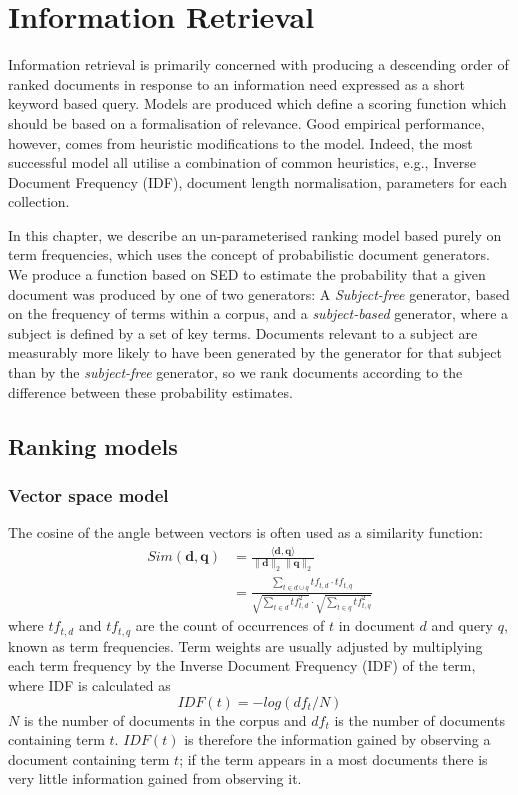 \chapter{Information Retrieval}\label{ch:information_retrieval}
Information retrieval is primarily concerned with producing a descending order of ranked documents in response to an information need expressed as a short keyword based query\cite{robertson:1997}.  Models are produced which define a scoring function which should be based on a formalisation of relevance.  Good empirical performance, however, comes from heuristic modifications to the model.  Indeed, the most successful model all utilise a combination of common heuristics, e.g., Inverse Document Frequency (IDF), document length normalisation, parameters for each collection.

In this chapter, we describe an un-parameterised ranking model based purely on term frequencies, which uses the concept of probabilistic document generators. We produce a function based on SED to estimate the probability that a given document was produced by one of two generators: A  \textit{Subject-free} generator, based on the frequency of terms within a corpus, and a  \textit{subject-based} generator, where a subject is defined by a set of key terms. Documents relevant to a subject are measurably more likely to have been generated by the generator for that subject than by the \textit{subject-free} generator, so we rank documents according to the difference between these probability estimates.
 
\section{Ranking models}
\subsection{Vector space model}
The cosine of the angle between vectors is often used as a similarity function: 
\begin{align}
Sim(\mathbf{d}, \mathbf{q}) &= \frac{\langle\mathbf{d}, \mathbf{q} \rangle}{\|\mathbf{d}\|_2\|\mathbf{q}\|_2}\\
&= \frac{\sum_{t \in d \cup q} tf_{t, d}\cdot tf_{t, q}}{\sqrt{\sum_{t \in d} tf_{t, d}^2}\cdot\sqrt{\sum_{t \in q} tf_{t, q}^2} }
\end{align}
where $tf_{t, d}$ and $tf_{t, q}$ are the count of occurrences of $t$ in document $d$ and query $q$, known as term frequencies.  Term weights are usually adjusted by multiplying each term frequency by the Inverse Document Frequency (IDF) of the term, where IDF is calculated as 
\begin{equation}
IDF(t) = -log(df_t / N)
\end{equation} 
$N$ is the number of documents in the corpus and $df_t$ is the number of documents containing term $t$.  $IDF(t)$ is therefore the information gained by observing a document containing term $t$; if the term appears in a most documents there is very little information gained from observing it.

